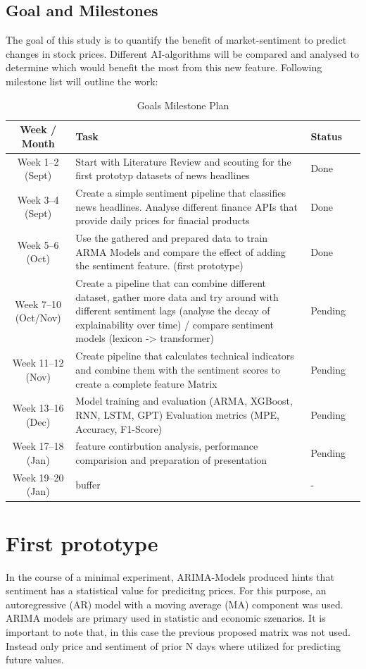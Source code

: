 \documentclass[MAI,Projekt,english,IEEE]{twbook}%
\begin{document}
\section{Goal and Milestones}
The goal of this study is to quantify the benefit of market-sentiment to predict changes in stock prices. Different AI-algorithms will be compared and analysed to determine which would benefit the most from this new feature. Following milestone list will outline the work:

\begin{table}[H]
\centering
\caption{Goals Milestone Plan}
\label{tab:milestones}
\begin{tabular}{|c|p{}|p{}|c|}
\hline
\textbf{Week / Month} & \textbf{Task} & \textbf{Status} \\
\hline
Week 1--2 (Sept) & Start with Literature Review and scouting for the first prototyp datasets of news headlines & Done \\
\hline
Week 3--4 (Sept) & Create a simple sentiment pipeline that classifies news headlines. Analyse different finance APIs that provide daily prices for finacial products & Done \\
\hline
Week 5--6 (Oct) & Use the gathered and prepared data to train ARMA Models and compare the effect of adding the sentiment feature. (first prototype) & Done \\
\hline
Week 7--10 (Oct/Nov) & Create a pipeline that can combine different dataset, gather more data and try around with different sentiment lags (analyse the decay of explainability over time) / compare sentiment models (lexicon -> transformer) & Pending \\
\hline
Week 11--12 (Nov) & Create pipeline that calculates technical indicators and combine them with the sentiment scores to create a complete feature Matrix & Pending \\
\hline
Week 13--16 (Dec) & Model training and evaluation (ARMA, XGBoost, RNN, LSTM, GPT) Evaluation metrics (MPE, Accuracy, F1-Score) & Pending \\
\hline
Week 17--18 (Jan) & feature contirbution analysis, performance comparision and preparation of presentation & Pending \\
\hline
Week 19--20 (Jan) & buffer & - \\
\hline
\end{tabular}
\end{table}

\chapter{First prototype}
In the course of a minimal experiment, ARIMA-Models produced hints that sentiment has a statistical value for predicitng prices. For this purpose, an autoregressive (AR) model with a moving average (MA) component was used. ARIMA models are primary used in statistic and economic szenarios. It is important to note that, in this case the previous proposed matrix was not used. Instead only price and sentiment of prior N days where utilized for predicting future values.
\end{document}

